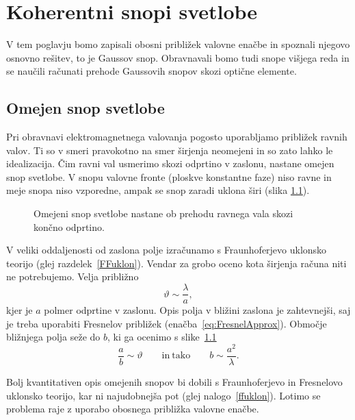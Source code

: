 
\chapter{Koherentni snopi svetlobe}
V tem poglavju bomo zapisali obosni približek valovne enačbe in spoznali 
njegovo osnovno rešitev, to je Gaussov snop. Obravnavali bomo tudi snope višjega reda in
se naučili računati prehode Gaussovih snopov skozi optične elemente. 

\section{Omejen snop svetlobe}
Pri obravnavi elektromagnetnega valovanja pogosto uporabljamo
približek ravnih valov. Ti so v smeri pravokotno na smer širjenja
neomejeni in so zato lahko le idealizacija. Čim ravni val usmerimo skozi odprtino
v zaslonu, nastane omejen snop svetlobe. V snopu valovne fronte (ploskve konstantne faze) 
niso ravne in meje snopa niso vzporedne, ampak se snop zaradi uklona širi 
(slika \ref{fig:Uklon-na-rezi}).
\begin{figure}[h]
\centering
\def\svgwidth{120truemm} 

\caption{Omejeni snop svetlobe nastane ob prehodu ravnega vala skozi končno odprtino.}
\label{fig:Uklon-na-rezi}
\end{figure}

V veliki oddaljenosti od zaslona polje izračunamo s
Fraunhoferjevo uklonsko teorijo (glej razdelek~\ref{FFuklon}). 
Vendar za grobo oceno kota širjenja računa niti ne potrebujemo. Velja približno 
\begin{equation}
\vartheta\sim\frac{\lambda}{a},
\label{eq:kot_ocena}
\end{equation}
kjer je $a$ polmer odprtine v zaslonu.
Opis polja v bližini zaslona je zahtevnejši, saj je treba uporabiti 
Fresnelov približek (enačba~\ref{eq:FresnelApprox}).
Območje bližnjega polja seže do $b$, ki ga ocenimo s slike~\ref{fig:Uklon-na-rezi}
\begin{equation}
\frac{a}{b}\sim \vartheta \qquad \mathrm{in~tako} \qquad b\sim\frac{a^2}{\lambda}.
\label{eq:z_ocena}
\end{equation}

Bolj kvantitativen opis omejenih
snopov bi dobili s Fraunhoferjevo in Fresnelovo uklonsko teorijo,
kar ni najudobnejša pot (glej nalogo~\ref{ffuklon}). Lotimo se problema raje z 
uporabo obosnega približka valovne enačbe.

